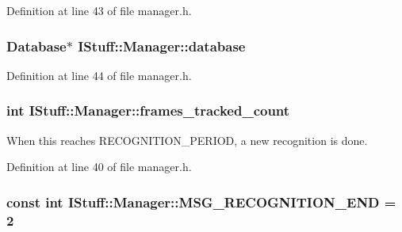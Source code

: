 Definition at line 43 of file manager.\-h.

\hypertarget{class_i_stuff_1_1_manager_aae57c3ee778cb782dc8dc954a6667c73}{
\subsubsection[{database}]{\setlength{\rightskip}{0pt plus 5cm}Database$\ast$ I\-Stuff\-::\-Manager\-::database\hspace{0.3cm}{\ttfamily [private]}}}\label{class_i_stuff_1_1_manager_aae57c3ee778cb782dc8dc954a6667c73}


Definition at line 44 of file manager.\-h.

\hypertarget{class_i_stuff_1_1_manager_a3cacb02ece1a4938e7754ad553c91a74}{
\subsubsection[{frames\-\_\-tracked\-\_\-count}]{\setlength{\rightskip}{0pt plus 5cm}int I\-Stuff\-::\-Manager\-::frames\-\_\-tracked\-\_\-count\hspace{0.3cm}{\ttfamily [private]}}}\label{class_i_stuff_1_1_manager_a3cacb02ece1a4938e7754ad553c91a74}


When this reaches R\-E\-C\-O\-G\-N\-I\-T\-I\-O\-N\-\_\-\-P\-E\-R\-I\-O\-D, a new recognition is done. 



Definition at line 40 of file manager.\-h.

\hypertarget{class_i_stuff_1_1_manager_a4c465ff50b8eddde0e5fd8b4d3e37bbc}{
\subsubsection[{M\-S\-G\-\_\-\-R\-E\-C\-O\-G\-N\-I\-T\-I\-O\-N\-\_\-\-E\-N\-D}]{\setlength{\rightskip}{0pt plus 5cm}const int I\-Stuff\-::\-Manager\-::\-M\-S\-G\-\_\-\-R\-E\-C\-O\-G\-N\-I\-T\-I\-O\-N\-\_\-\-E\-N\-D = 2\hspace{0.3cm}{\ttfamily [static]}}}\label{class_i_stuff_1_1_manager_a4c465ff50b8eddde0e5fd8b4d3e37bbc}


